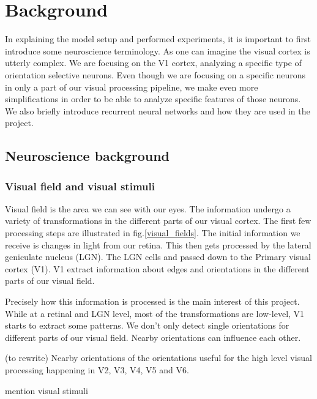 \chapter{Background}

In explaining the model setup and performed experiments, it is important to first introduce some neuroscience terminology. As one can imagine the visual cortex is utterly complex. We are focusing on the V1 cortex, analyzing a specific type of orientation selective neurons. Even though we are focusing on a specific neurons in only a part of our visual processing pipeline, we make even more simplifications in order to be able to analyze specific features of those neurons. We also briefly introduce recurrent neural networks and how they are used in the project.

\section{Neuroscience background}
\subsection{Visual field and visual stimuli}

Visual field is the area we can see with our eyes. The information undergo a variety of transformations in the different parts of our visual cortex. The first few processing steps are illustrated in fig.\ref{visual_fields}. The initial information we receive is changes in light from our retina. This then gets processed by the lateral geniculate nucleus (LGN). The LGN cells  and passed down to the Primary visual cortex (V1). V1 extract information about edges and orientations in the different parts of our visual field. 


Precisely how this information is processed is the main interest of this project. While at a retinal and LGN level, most of the transformations are low-level, V1 starts to extract some patterns. We don't only detect single orientations for different parts of our visual field. Nearby orientations can influence each other. 

(to rewrite)
Nearby orientations of the orientations useful for the high level visual processing happening in V2, V3, V4, V5 and V6. 

mention visual stimuli

